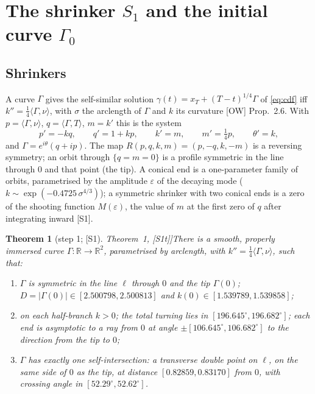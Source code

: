\documentclass[11pt]{amsart}
\newtheorem{theorem}{Theorem}[section]
\theoremstyle{definition}
\theoremstyle{remark}
\newcommand{\R}{\mathbb{R}}
\newcommand{\eps}{\varepsilon}
\newcommand{\ip}[2]{\langle #1,#2\rangle}
\newcommand{\dref}[1]{[\textsf{#1}]}
\begin{document}
\section{The shrinker \texorpdfstring{$S_1$}{S1} and the initial curve \texorpdfstring{$\Gamma_0$}{Gamma0}}\label{s:data}

\subsection{Shrinkers}
A curve $\Gamma$ gives the self-similar solution $\gamma(t)=x_T+(T-t)^{1/4}\Gamma$ of \eqref{eq:cdf} iff $k''=\frac14\ip{\Gamma}{\nu}$, with $\sigma$ the arclength of $\Gamma$ and $k$ its curvature \dref{OW} Prop.~2.6. With $p=\ip\Gamma\nu$, $q=\ip\Gamma T$, $m=k'$ this is the system
\begin{equation}\label{eq:prof}
p'=-kq,\qquad q'=1+kp,\qquad k'=m,\qquad m'=\tfrac14p,\qquad\theta'=k,
\end{equation}
and $\Gamma=e^{i\theta}(q+ip)$. The map $R(p,q,k,m)=(p,-q,k,-m)$ is a reversing symmetry; an orbit through $\{q=m=0\}$ is a profile symmetric in the line through $0$ and that point (the tip). A conical end is a one-parameter family of orbits, parametrised by the amplitude $\eps$ of the decaying mode ($k\sim\exp(-0.4725\,\sigma^{4/3})$); a symmetric shrinker with two conical ends is a zero of the shooting function $M(\eps)$, the value of $m$ at the first zero of $q$ after integrating inward \dref{S1}.

\begin{theorem}[step 1; \dref{S1} Theorem~1, \dref{S1t}]\label{thm:S1}
There is a smooth, properly immersed curve $\Gamma:\R\to\R^2$, parametrised by arclength, with $k''=\frac14\ip\Gamma\nu$, such that:
\begin{enumerate}[label=\textup{(\alph*)},leftmargin=*,itemsep=1pt]
\item $\Gamma$ is symmetric in the line $\ell$ through $0$ and the tip $\Gamma(0)$; $D=|\Gamma(0)|\in[2.500798,2.500813]$ and $k(0)\in[1.539789,1.539858]$;
\item on each half-branch $k>0$; the total turning lies in $[196.645^\circ,196.682^\circ]$; each end is asymptotic to a ray from $0$ at angle $\pm[106.645^\circ,106.682^\circ]$ to the direction from the tip to $0$;
\item $\Gamma$ has exactly one self-intersection: a transverse double point on $\ell$, on the same side of $0$ as the tip, at distance $[0.82859,0.83170]$ from $0$, with crossing angle in $[52.29^\circ,52.62^\circ]$.
\end{enumerate}
\end{theorem}
\end{document}
